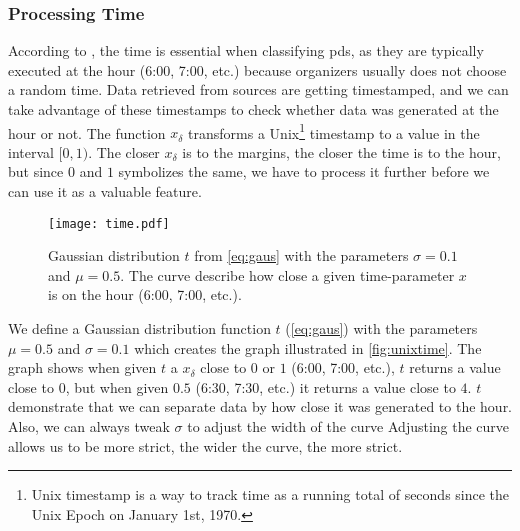\subsubsection{Processing Time}
According to \cite{P&D_anatomy}, the time is essential when classifying \acp{pd}, as they are typically executed at the hour (6:00, 7:00, etc.) because organizers usually does not choose a random time. Data retrieved from sources are getting timestamped, and we can take advantage of these timestamps to check whether data was generated at the hour or not. The function $x_\delta$ transforms a Unix\footnote{Unix timestamp is a way to track time as a running total of seconds since the Unix Epoch on January 1st, 1970.} timestamp to a value in the interval $[0, 1)$. The closer $x_\delta$ is to the margins, the closer the time is to the hour, but since $0$ and $1$ symbolizes the same, we have to process it further before we can use it as a valuable feature.

\begin{figure}
    \centering
    \texttt{[image: time.pdf]}
    \caption[\project's time processing curve]{Gaussian distribution $t$ from \autoref{eq:gaus} with the parameters $\sigma=0.1$ and $\mu=0.5$. The curve describe how close a given time-parameter $x$ is on the hour (6:00, 7:00, etc.).}
    \label{fig:unixtime}
\end{figure}



We define a Gaussian distribution function $t$ (\autoref{eq:gaus}) with the parameters $\mu=0.5$ and $\sigma=0.1$ which creates the graph illustrated in \autoref{fig:unixtime}. The graph shows when given $t$ a $x_\delta$ close to $0$ or $1$ (6:00, 7:00, etc.), $t$ returns a value close to $0$, but when given $0.5$ (6:30, 7:30, etc.) it returns a value close to $4$. $t$ demonstrate that we can separate data by how close it was generated to the hour. Also, we can always tweak $\sigma$ to adjust the width of the curve Adjusting the curve allows us to be more strict, the wider the curve, the more strict.

